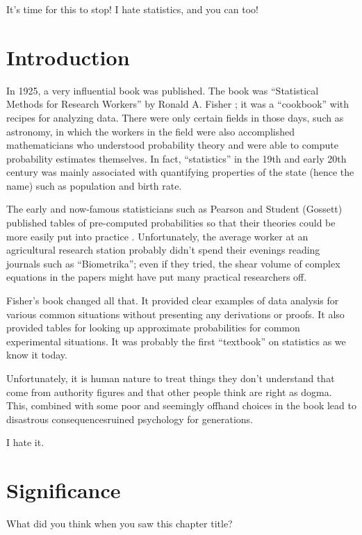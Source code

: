 \documentclass[
]{book}
\begin{document}
It's time for this to stop! I hate statistics, and you can too!

\hypertarget{intro}{%
\chapter{Introduction}\label{intro}}

In 1925, a very influential book was published. The book was ``Statistical Methods for Research Workers'' by Ronald A. Fisher \citeyearpar{fisher}; it was a ``cookbook'' with recipes for analyzing data. There were only certain fields in those days, such as astronomy, in which the workers in the field were also accomplished mathematicians who understood probability theory and were able to compute probability estimates themselves. In fact, ``statistics'' in the 19th and early 20th century was mainly associated with quantifying properties of the state (hence the name) such as population and birth rate.

The early and now-famous statisticians such as Pearson and Student (Gossett) published tables of pre-computed probabilities so that their theories could be more easily put into practice \citep[\citet{student1908}]{pearson1900}. Unfortunately, the average worker at an agricultural research station probably didn't spend their evenings reading journals such as ``Biometrika''; even if they tried, the shear volume of complex equations in the papers might have put many practical researchers off.

Fisher's book changed all that. It provided clear examples of data analysis for various common situations without presenting any derivations or proofs. It also provided tables for looking up approximate probabilities for common experimental situations. It was probably the first ``textbook'' on statistics as we know it today.

Unfortunately, it is human nature to treat things they don't understand that come from authority figures and that other people think are right as dogma. This, combined with some poor and seemingly offhand choices in the book lead to disastrous consequencesruined psychology for generations.

I hate it.

\hypertarget{signif}{%
\chapter{Significance}\label{signif}}

What did you think when you saw this chapter title?
\end{document}
